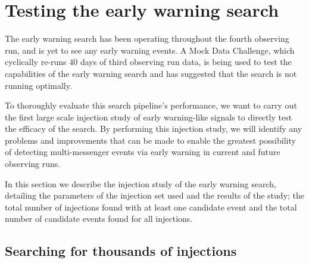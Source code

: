 \section{\label{6:sec:injection-tests}Testing the early warning search}

The early warning search has been operating throughout the fourth observing run, and is yet to see any early warning events. A Mock Data Challenge, which cyclically re-runs $40$ days of third observing run data, is being used to test the capabilities of the early warning search and has suggested that the search is not running optimally.

To thoroughly evaluate this search pipeline's performance, we want to carry out the first large scale injection study of early warning-like \gwadj signals to directly test the efficacy of the search. By performing this injection study, we will identify any problems and improvements that can be made to enable the greatest possibility of detecting multi-messenger events via early warning in current and future observing runs.

In this section we describe the injection study of the early warning search, detailing the parameters of the injection set used and the results of the study; the total number of injections found with at least one candidate event and the total number of candidate events found for all injections.

\subsection{\label{6:sec:injection-set}Searching for thousands of \gwadj injections}

